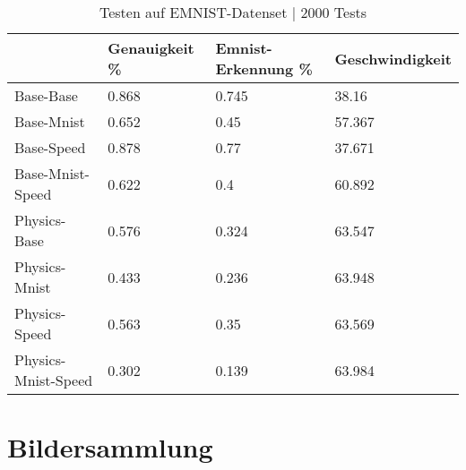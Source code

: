 \begin{table}[!ht]
    \centering
    \caption{Testen auf EMNIST-Datenset | 2000 Tests}
    \begin{tabular}{|l|l|l|l|}
    \hline
        ~ & Genauigkeit \% & Emnist-Erkennung \% & Geschwindigkeit \\ \hline
        Base-Base & 0.868 & 0.745 & 38.16 \\ \hline
        Base-Mnist & 0.652 & 0.45 & 57.367 \\ \hline
        Base-Speed & 0.878 & 0.77 & 37.671 \\ \hline
        Base-Mnist-Speed & 0.622 & 0.4 & 60.892 \\ \hline
        Physics-Base & 0.576 & 0.324 & 63.547 \\ \hline
        Physics-Mnist & 0.433 & 0.236 & 63.948 \\ \hline
        Physics-Speed & 0.563 & 0.35 & 63.569 \\ \hline
        Physics-Mnist-Speed & 0.302 & 0.139 & 63.984 \\ \hline
    \end{tabular}
    \label{tab:EMNIST}
\end{table}

\section{Bildersammlung}
